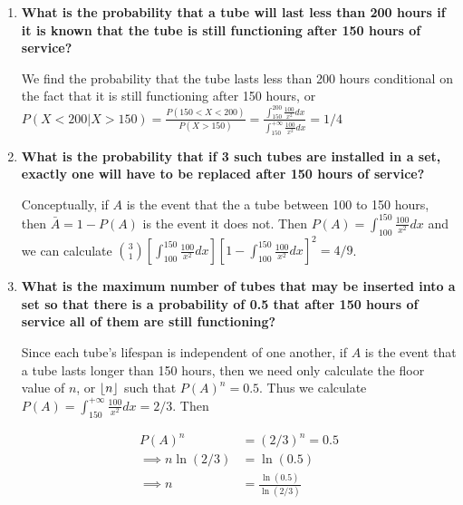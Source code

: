 \documentclass[10pt, oneside]{article}   	%
\theoremstyle{definition}
\DeclarePairedDelimiter\floor{\lfloor}{\rfloor}
\begin{document}
\begin{enumerate}[label=4.\arabic*]
	\begin{enumerate}
	\item  \begin{tcolorbox}[
	  colback=Cerulean!5!white,
	  colframe=Cerulean!75!black]
	\textbf{What is the probability that a tube will last less than 200 hours if it is known that the tube is still functioning after 150 hours of service?}
	\end{tcolorbox}
	
	We find the probability that the tube lasts less than 200 hours conditional on the fact that it is still functioning after 150 hours, or $P(X < 200 | X > 150) = \frac{P(150 < X < 200)}{P(X > 150)} = \frac{\int^{200}_{150} \frac{100}{x^2} dx }{\int^{+\infty}_{150} \frac{100}{x^2} dx} = \boxed{1/4}$
	
	\item  \begin{tcolorbox}[
	  colback=Cerulean!5!white,
	  colframe=Cerulean!75!black]
	\textbf{What is the probability that if 3 such tubes are installed in a set, exactly one will have to be replaced after 150 hours of service?}
	\end{tcolorbox}
	
	Conceptually, if $A$ is the event that the a tube between 100 to 150 hours, then $\bar{A} = 1 - P(A)$ is the event it does not. Then $P(A) = \int^{150}_{100} \frac{100}{x^2}dx$ and we can calculate $\binom{3}{1} [\int^{150}_{100} \frac{100}{x^2} dx] [1 - \int^{150}_{100} \frac{100}{x^2} dx]^2 = \boxed{4/9}$.
	
	\item  \begin{tcolorbox}[
	  colback=Cerulean!5!white,
	  colframe=Cerulean!75!black]
	\textbf{What is the maximum number of tubes that may be inserted into a set so that there is a probability of 0.5 that after 150 hours of service all of them are still functioning?}
	\end{tcolorbox}
	
	Since each tube's lifespan is independent of one another, if $A$ is the event that a tube lasts longer than 150 hours, then we need only calculate the floor value of $n$, or $\floor{n}$ such that $P(A)^n = 0.5$. Thus we calculate $P(A) = \int^{+\infty}_{150} \frac{100}{x^2} dx = 2/3$. Then
	
	\begin{align*}
	P(A)^n &= (2/3)^n = 0.5 \\
	\implies n \ln (2/3) &= \ln (0.5) \\
	\implies n &= \frac{\ln (0.5)}{ \ln(2/3)}
	\end{align*}
	

\end{enumerate}
\end{enumerate}
\end{document}

